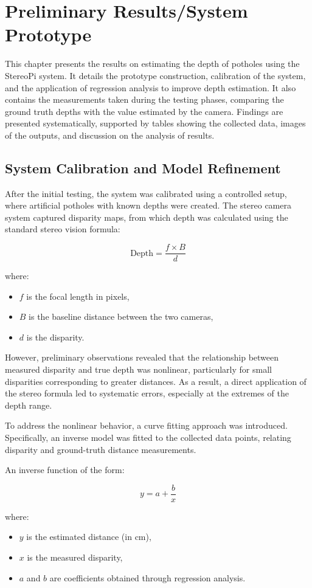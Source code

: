 \chapter{Preliminary Results/System Prototype}
This chapter presents the results on estimating the depth of potholes using the StereoPi system. It details the prototype construction, calibration of the system, and the application of regression analysis to improve depth estimation. It also contains the measurements taken during the testing phases, comparing the ground truth depths with the value estimated by the camera. Findings are presented systematically, supported by tables showing the collected data, images of the outputs, and discussion on the analysis of results.

\section{\textbf{System Calibration and Model Refinement}}
After the initial testing, the system was calibrated using a controlled setup, where artificial potholes with known depths were created. The stereo camera system captured disparity maps, from which depth was calculated using the standard stereo vision formula:

\[
\text{Depth} = \frac{f \times B}{d}
\]

where:
\begin{itemize}
	\item \( f \) is the focal length in pixels,
	\item \( B \) is the baseline distance between the two cameras,
	\item \( d \) is the disparity.
\end{itemize}


However, preliminary observations revealed that the relationship between measured disparity and true depth was nonlinear, particularly for small disparities corresponding to greater distances. As a result, a direct application of the stereo formula led to systematic errors, especially at the extremes of the depth range.

To address the nonlinear behavior, a curve fitting approach was introduced. Specifically, an inverse model was fitted to the collected data points, relating disparity and ground-truth distance measurements.

An inverse function of the form:

\[
y = a + \frac{b}{x}
\]

where:
\begin{itemize}
	\item \( y \) is the estimated distance (in cm),
	\item \( x \) is the measured disparity,
	\item \( a \) and \( b \) are coefficients obtained through regression analysis.
\end{itemize}

